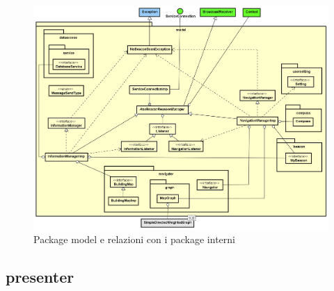\documentclass[../DefinizioneDiProdotto.tex,lanscape]{subfiles}
\begin{document}
\begin{figure}[h]
	\includegraphics[width=\textwidth]{img/RelationPackage/model}
	\caption{Package model e relazioni con i package interni}
	\label{modelPackage}
\end{figure}

\newpage
	\subsection{presenter}
	
\end{document}
